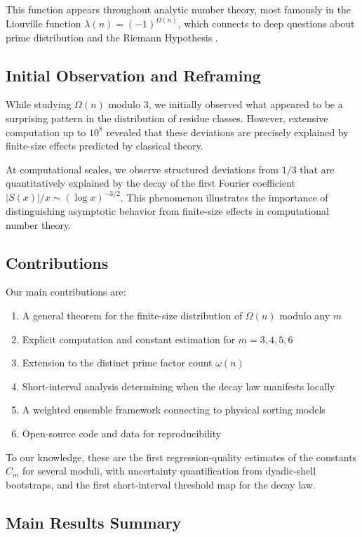 \documentclass[12pt]{article}
\theoremstyle{definition}
\theoremstyle{remark}
\begin{document}
This function appears throughout analytic number theory, most famously in the Liouville function $\lambda(n) = (-1)^{\Omega(n)}$, which connects to deep questions about prime distribution and the Riemann Hypothesis \cite{polya1919verschiedene, borwein2008sign}.

\subsection{Initial Observation and Reframing}

While studying $\Omega(n)$ modulo 3, we initially observed what appeared to be a surprising pattern in the distribution of residue classes. However, extensive computation up to $10^8$ revealed that these deviations are precisely explained by finite-size effects predicted by classical theory.

At computational scales, we observe structured deviations from $1/3$ that are quantitatively explained by the decay of the first Fourier coefficient $|S(x)|/x \sim (\log x)^{-3/2}$. This phenomenon illustrates the importance of distinguishing asymptotic behavior from finite-size effects in computational number theory.

\subsection{Contributions}

Our main contributions are:
\begin{enumerate}
\item A general theorem for the finite-size distribution of $\Omega(n)$ modulo any $m$
\item Explicit computation and constant estimation for $m = 3, 4, 5, 6$
\item Extension to the distinct prime factor count $\omega(n)$
\item Short-interval analysis determining when the decay law manifests locally
\item A weighted ensemble framework connecting to physical sorting models
\item Open-source code and data for reproducibility
\end{enumerate}

To our knowledge, these are the first regression-quality estimates of the constants $C_m$ for several moduli, with uncertainty quantification from dyadic-shell bootstraps, and the first short-interval threshold map for the decay law.

\subsection{Main Results Summary}
\end{document}
